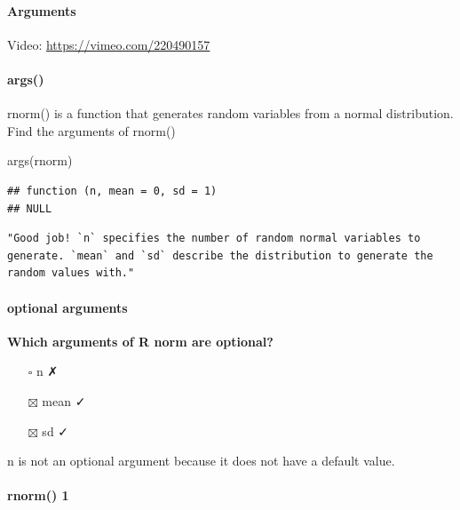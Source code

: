 \documentclass[
]{article}
\newenvironment{Shaded}{\begin{snugshade}}{\end{snugshade}}
\newcommand{\FunctionTok}[1]{\textcolor[rgb]{0.00,0.00,0.00}{#1}}
\newcommand{\NormalTok}[1]{#1}
\providecommand{\tightlist}{%
  \setlength{\itemsep}{0pt}\setlength{\parskip}{0pt}}
\begin{document}
\hypertarget{arguments-1}{%
\paragraph{Arguments}\label{arguments-1}}

Video: \url{https://vimeo.com/220490157}

\hypertarget{args}{%
\paragraph{args()}\label{args}}

rnorm() is a function that generates random variables from a normal
distribution. Find the arguments of rnorm()

\begin{Shaded}
\begin{Highlighting}[]
\FunctionTok{args}\NormalTok{(rnorm)}
\end{Highlighting}
\end{Shaded}

\begin{verbatim}
## function (n, mean = 0, sd = 1) 
## NULL
\end{verbatim}

\begin{verbatim}
"Good job! `n` specifies the number of random normal variables to generate. `mean` and `sd` describe the distribution to generate the random values with."
\end{verbatim}

\hypertarget{optional-arguments}{%
\paragraph{optional arguments}\label{optional-arguments}}

\textbf{Which arguments of R norm are optional?}

\begin{itemize}
\tightlist
\item[$\square$]
  n ✗
\item[$\boxtimes$]
  mean ✓
\item[$\boxtimes$]
  sd ✓
\end{itemize}

n is not an optional argument because it does not have a default value.

\hypertarget{rnorm-1}{%
\paragraph{rnorm() 1}\label{rnorm-1}}
\end{document}
